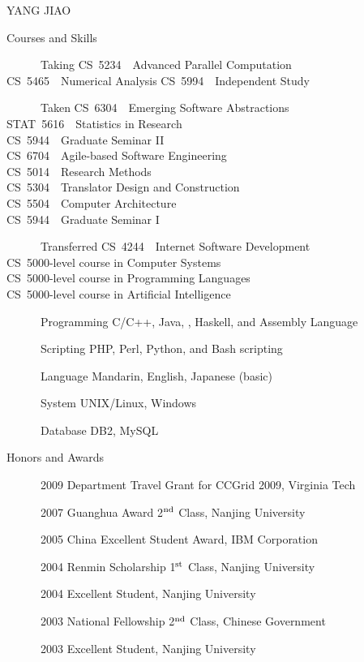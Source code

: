 \documentclass{article}
\newcommand{\up}[1]{\ensuremath{^\textrm{\scriptsize#1}}}
\begin{document}
\begin{cv}{YANG JIAO}
\begin{cvlist}{Courses and Skills}
\item [~~~~~~Taking]
CS~5234~~Advanced Parallel Computation\\
CS~5465~~Numerical Analysis
CS~5994~~Independent Study
\item [~~~~~~Taken]
CS~6304~~Emerging Software Abstractions \\ 
STAT~5616~~Statistics in Research \\
CS~5944~~Graduate Seminar II \\
CS~6704~~Agile-based Software Engineering \\
CS~5014~~Research Methods \\
CS~5304~~Translator Design and Construction \\
CS~5504~~Computer Architecture \\
CS~5944~~Graduate Seminar I
\item [~~~~~~Transferred]
CS~4244~~Internet Software Development \\
CS~5000-level course in Computer Systems \\
CS~5000-level course in Programming Languages \\
CS~5000-level course in Artificial Intelligence
\item [~~~~~~Programming] C/C++, Java, \LaTeXe, Haskell, and Assembly Language
\item [~~~~~~Scripting] PHP, Perl, Python, and Bash scripting
\item [~~~~~~Language] Mandarin, English, Japanese (basic)
\item [~~~~~~System] UNIX/Linux, Windows 
\item [~~~~~~Database] DB2, MySQL
\end{cvlist}

\begin{cvlist}{Honors and Awards}
\item [~~~~~~2009] Department Travel Grant for CCGrid 2009, Virginia Tech
\item [~~~~~~2007] Guanghua Award 2\up{nd} Class, Nanjing University
\item [~~~~~~2005] China Excellent Student Award, IBM Corporation
\item [~~~~~~2004] Renmin Scholarship 1\up{st} Class, Nanjing University
\item [~~~~~~2004] Excellent Student, Nanjing University
\item [~~~~~~2003] National Fellowship 2\up{nd} Class, Chinese Government
\item [~~~~~~2003] Excellent Student, Nanjing University
\end{cvlist}


\end{cv}
\end{document}
